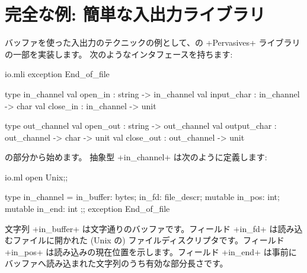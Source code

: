 \section{完全な例: 簡単な入出力ライブラリ}

バッファを使った入出力のテクニックの例として、\ocaml の \ml+Pervasives+ ライブラリの一部を実装します。 次のようなインタフェースを持ちます:
%
\begin{listingcodefile}{io.mli}
exception End_of_file

type in_channel
val open_in : string -> in_channel
val input_char : in_channel -> char
val close_in : in_channel -> unit

type out_channel
val open_out : string -> out_channel
val output_char : out_channel -> char -> unit
val close_out : out_channel -> unit
\end{listingcodefile}
%
 の部分から始めます。
抽象型 \ml+in_channel+ は次のように定義します:
%
\begin{listingcodefile}{io.ml}
open Unix;;

type in_channel =
  { in_buffer: bytes;
    in_fd: file_descr;
    mutable in_pos: int;
    mutable in_end: int };;
exception End_of_file
\end{listingcodefile}
%
文字列 \ml+in_buffer+ は文字通りのバッファです。フィールド \ml+in_fd+ は読み込むファイルに開かれた (Unix の) ファイルディスクリプタです。フィールド \ml+in_pos+ は読み込みの現在位置を示します。フィールド \ml+in_end+ は事前にバッファへ読み込まれた文字列のうち有効な部分長さです。
%
